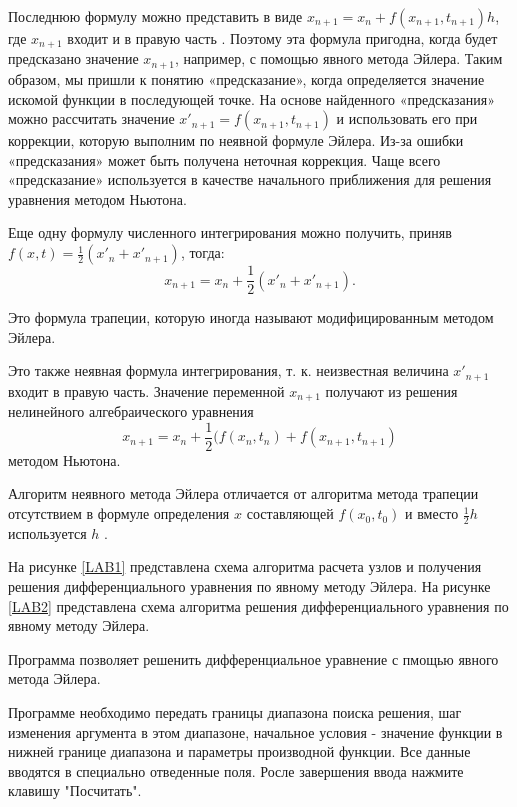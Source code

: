 Последнюю формулу можно представить  в виде $x_{n+1} =x_n +f(x_{n+1},t_{n+1} )h$, где  $x_{n+1}$ входит и в правую 
часть .  Поэтому  эта  формула  пригодна,  когда  будет  предсказано  значение  $x_{n+1}$, 
например,  с  помощью  явного  метода  Эйлера.  Таким  образом,  мы  пришли  к  понятию 
«предсказание»,  когда  определяется  значение  искомой  функции  в  последующей  точке.  На 
основе  найденного  «предсказания»  можно  рассчитать  значение  $x'_{n+1}=  f ( x_{n+1},t_{n+1} )$ и 
использовать  его  при  коррекции,  которую  выполним  по  неявной  формуле  Эйлера.  Из-за 
ошибки «предсказания» может быть получена неточная коррекция. Чаще всего «предсказание» 
используется  в  качестве  начального  приближения  для  решения  уравнения  методом 
Ньютона. 
         
Еще  одну  формулу  численного  интегрирования  можно  получить,  приняв \\
$f(x,t)=\frac{1}{2}(x'_n+x'_{n+1})$, тогда:                                                                                        
$$x_{n+1}=x_n+\frac{1}{2}(x'_n+x'_{n+1}).$$

Это формула трапеции, которую иногда называют модифицированным методом Эйлера. 

Это  также  неявная  формула  интегрирования,  т.  к.  неизвестная  величина  $x'_{n+1}$  входит  в 
правую часть. Значение переменной  $x_{n+1}$ получают из решения нелинейного алгебраического 
уравнения  
$$x_{n+1}=x_n+\frac{1}{2}(f(x_n,t_n)+f(x_{n+1},t_{n+1})$$
методом Ньютона. 

Алгоритм неявного метода Эйлера отличается от алгоритма метода трапеции отсутствием в 
формуле определения  $x$  составляющей  $f (x_0,t_0)$  и вместо 
$\frac{1}{2}h$  используется $h$ . 

На рисунке \ref{LAB1} представлена схема алгоритма расчета узлов и получения решения дифференциального уравнения по явному методу Эйлера.
На рисунке \ref{LAB2} представлена схема алгоритма решения дифференциального уравнения по явному методу Эйлера.

\clearpage
{}
Программа позволяет решенить дифференциальное уравнение с пмощью явного метода Эйлера.

Программе необходимо передать границы диапазона поиска решения, шаг изменения аргумента в этом диапазоне, начальное условия - значение функции в нижней границе диапазона и параметры производной функции. Все данные вводятся в специально отведенные поля. Росле завершения ввода нажмите клавишу "Посчитать".

